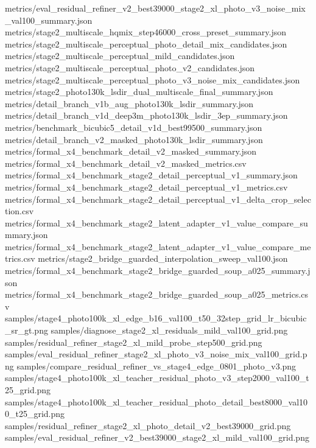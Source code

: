 \documentclass[
  10pt,
]{article}
\newenvironment{Shaded}{}{}
\newcommand{\NormalTok}[1]{#1}
\begin{document}
\begin{Shaded}
\begin{Highlighting}[]
\NormalTok{metrics/eval\_residual\_refiner\_v2\_best39000\_stage2\_xl\_photo\_v3\_noise\_mix\_val100\_summary.json}
\NormalTok{metrics/stage2\_multiscale\_hqmix\_step46000\_cross\_preset\_summary.json}
\NormalTok{metrics/stage2\_multiscale\_perceptual\_photo\_detail\_mix\_candidates.json}
\NormalTok{metrics/stage2\_multiscale\_perceptual\_mild\_candidates.json}
\NormalTok{metrics/stage2\_multiscale\_perceptual\_photo\_v2\_candidates.json}
\NormalTok{metrics/stage2\_multiscale\_perceptual\_photo\_v3\_noise\_mix\_candidates.json}
\NormalTok{metrics/stage2\_photo130k\_lsdir\_dual\_multiscale\_final\_summary.json}
\NormalTok{metrics/detail\_branch\_v1b\_aug\_photo130k\_lsdir\_summary.json}
\NormalTok{metrics/detail\_branch\_v1d\_deep3m\_photo130k\_lsdir\_3ep\_summary.json}
\NormalTok{metrics/benchmark\_bicubic5\_detail\_v1d\_best99500\_summary.json}
\NormalTok{metrics/detail\_branch\_v2\_masked\_photo130k\_lsdir\_summary.json}
\NormalTok{metrics/formal\_x4\_benchmark\_detail\_v2\_masked\_summary.json}
\NormalTok{metrics/formal\_x4\_benchmark\_detail\_v2\_masked\_metrics.csv}
\NormalTok{metrics/formal\_x4\_benchmark\_stage2\_detail\_perceptual\_v1\_summary.json}
\NormalTok{metrics/formal\_x4\_benchmark\_stage2\_detail\_perceptual\_v1\_metrics.csv}
\NormalTok{metrics/formal\_x4\_benchmark\_stage2\_detail\_perceptual\_v1\_delta\_crop\_selection.csv}
\NormalTok{metrics/formal\_x4\_benchmark\_stage2\_latent\_adapter\_v1\_value\_compare\_summary.json}
\NormalTok{metrics/formal\_x4\_benchmark\_stage2\_latent\_adapter\_v1\_value\_compare\_metrics.csv}
\NormalTok{metrics/stage2\_bridge\_guarded\_interpolation\_sweep\_val100.json}
\NormalTok{metrics/formal\_x4\_benchmark\_stage2\_bridge\_guarded\_soup\_a025\_summary.json}
\NormalTok{metrics/formal\_x4\_benchmark\_stage2\_bridge\_guarded\_soup\_a025\_metrics.csv}
\NormalTok{samples/stage4\_photo100k\_xl\_edge\_b16\_val100\_t50\_32step\_grid\_lr\_bicubic\_sr\_gt.png}
\NormalTok{samples/diagnose\_stage2\_xl\_residuals\_mild\_val100\_grid.png}
\NormalTok{samples/residual\_refiner\_stage2\_xl\_mild\_probe\_step500\_grid.png}
\NormalTok{samples/eval\_residual\_refiner\_stage2\_xl\_photo\_v3\_noise\_mix\_val100\_grid.png}
\NormalTok{samples/compare\_residual\_refiner\_vs\_stage4\_edge\_0801\_photo\_v3.png}
\NormalTok{samples/stage4\_photo100k\_xl\_teacher\_residual\_photo\_v3\_step2000\_val100\_t25\_grid.png}
\NormalTok{samples/stage4\_photo100k\_xl\_teacher\_residual\_photo\_detail\_best8000\_val100\_t25\_grid.png}
\NormalTok{samples/residual\_refiner\_stage2\_xl\_photo\_detail\_v2\_best39000\_grid.png}
\NormalTok{samples/eval\_residual\_refiner\_v2\_best39000\_stage2\_xl\_mild\_val100\_grid.png}

\end{Highlighting}
\end{Shaded}
\end{document}
